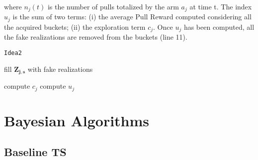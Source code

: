 where $n_j(t)$ is the number of pulls totalized by the arm $a_j$ at time t. The index $u_j$ is the sum of two terms: (i) the average Pull Reward computed considering all the acquired buckets; (ii) the exploration term  $c_j$. Once $u_j$ has been computed, all the fake realizations are removed from the buckets (line 11).

\begin{algorithm}[H]
	\caption{\texttt{Idea2}}
	\begin{scriptsize}
		\begin{algorithmic}[1]
			
			
			
			
			\State fill $\boldsymbol{Z_{j,s}}$ with fake realizations
			\EndIf
			
			\EndFor		
			\State compute $c_j$\;
			\State compute $u_j$\;
			
	
							
			\EndFor
			
					
			\EndFunction
			
		\end{algorithmic}
	\end{scriptsize}
	\label{alg:Idea2}
\end{algorithm}




\section{Bayesian Algorithms}

\subsection{Baseline TS}

